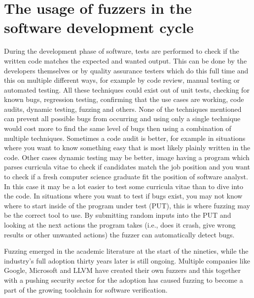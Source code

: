 \section{The usage of fuzzers in the software development cycle}
\label{intro:SoftwareDevelopmentCycle}
During the development phase of software, tests are performed to check if the written code matches the expected and wanted output. This can be done by the developers themselves or by quality assurance testers which do this full time and this on multiple different ways, for example by code review, manual testing or automated testing. All these techniques could exist out of unit tests, checking for known bugs, regression testing, confirming that the use cases are working, code audits, dynamic testing, fuzzing and others. None of the techniques mentioned can prevent all possible bugs from occurring and using only a single technique would cost more to find the same level of bugs then using a combination of multiple techniques. Sometimes a code audit is better, for example in situations where you want to know something easy that is most likely plainly written in the code. Other cases dynamic testing may be better, image having a program which parses curricula vitae to check if candidates match the job position and you want to check if a fresh computer science graduate fit the position of software analyst. In this case it may be a lot easier to test some curricula vitae than to dive into the code. In situations where you want to test if bugs exist, you may not know where to start inside of the program under test (PUT), this is where fuzzing may be the correct tool to use. By submitting random inputs into the PUT and looking at the next actions the program takes (i.e., does it crash, give wrong results or other unwanted actions) the fuzzer can automatically detect bugs.

Fuzzing emerged in the academic literature at the start of the nineties, while the industry's full adoption thirty years later is still ongoing. Multiple companies like Google, Microsoft and LLVM have created their own fuzzers and this together with a pushing security sector for the adoption has caused fuzzing to become a part of the growing toolchain for software verification.

